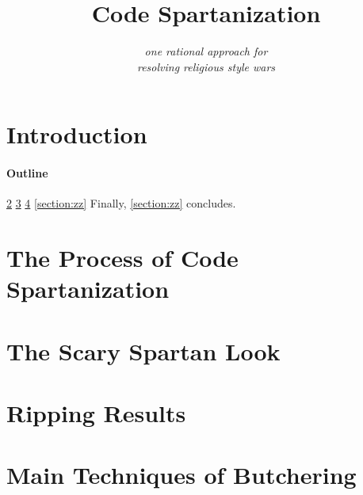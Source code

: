 \documentclass[preprint,10pt,nonatbib]{sigplanconf}
\title{Code Spartanization}
\subtitle{\scriptsize \emph{one rational approach for\\ resolving religious style wars}}
\begin{document}
\maketitle

\def\ignore#1{}
\def\gal{\marginpar[G$\Rightarrow$]{$\Leftarrow$G}}
\def\yossi{\marginpar[Y$\Rightarrow$]{$\Leftarrow$Y}}
\def\matteo{\marginpar[M$\Rightarrow$]{$\Leftarrow$M}}

\begin{abstract}
  
\end{abstract}

\section{Introduction}


\paragraph{Outline}
\cref{section:principia}
\cref{section:look}
\cref{section:initial}
\cref{section:zz}
Finally, \cref{section:zz} concludes.

\section{The Process of Code Spartanization}
\label{section:principia}


\section{The Scary Spartan Look}
\label{section:look}


\section{Ripping Results}
\label{section:initial}


\balance
\label{section:zz}


\small


\appendix
\section{Main Techniques of Butchering}
\label{section:techniques}

\end{document}
